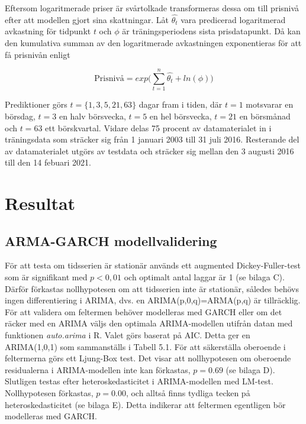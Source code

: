 \documentclass[11pt]{article}
\numberwithin{equation}{section}
\numberwithin{table}{section}
\numberwithin{figure}{section}
\begin{document}
Eftersom logaritmerade priser är svårtolkade transformeras dessa om till prisnivå efter att modellen gjort sina skattningar. Låt $\hat{\theta_t}$ vara predicerad logaritmerad avkastning för tidpunkt $t$ och $\phi$ är träningsperiodens sista prisdatapunkt. Då kan den kumulativa summan av den logaritmerade avkastningen exponentieras för att få prisnivån enligt

\begin{equation}
    \text{Prisnivå} =  exp\Big({\sum\limits_{t=1}^n \hat{\theta_{t}}} + ln(\phi)\Big)
\end{equation}

Prediktioner görs $t=\{1, 3, 5, 21, 63\}$ dagar fram i tiden, där $t=1$ motsvarar en börsdag,  $t=3$ en halv börsvecka, $t=5$ en hel börsvecka, $t=21$ en börsmånad och $t=63$ ett börskvartal. Vidare delas 75 procent av datamaterialet in i träningsdata som sträcker sig från 1 januari 2003 till 31 juli 2016. Resterande del av datamaterialet utgörs av testdata och sträcker sig mellan den 3 augusti 2016 till den 14 febuari 2021. 

\section{Resultat}
\subsection{ARMA-GARCH modellvalidering}
För att testa om tidsserien är stationär används ett augmented Dickey-Fuller-test som är signifikant med $p<0,01$ och optimalt antal laggar är 1 (se bilaga C). Därför förkastas nollhypotesen om att tidsserien inte är stationär, således behövs ingen differentiering i ARIMA, dvs. en ARIMA(p,0,q)=ARMA(p,q) är tillräcklig. För att validera om feltermen behöver modelleras med GARCH eller om det räcker med en ARIMA väljs den optimala ARIMA-modellen utifrån datan med funktionen \textit{auto.arima} i R. Valet görs baserat på AIC. Detta ger en ARIMA(1,0,1) som sammanställs i Tabell 5.1. För att säkerställa oberoende i feltermerna görs ett Ljung-Box test. Det visar att nollhypotesen om oberoende residualerna i ARIMA-modellen inte kan förkastas, $p=0.69$ (se bilaga D). Slutligen testas efter heteroskedasticitet i ARIMA-modellen med LM-test. Nollhypotesen förkastas, $p=0.00$, och alltså finns tydliga tecken på heteroskedasticitet (se bilaga E). Detta indikerar att feltermen egentligen bör modelleras med GARCH. 
\end{document}
